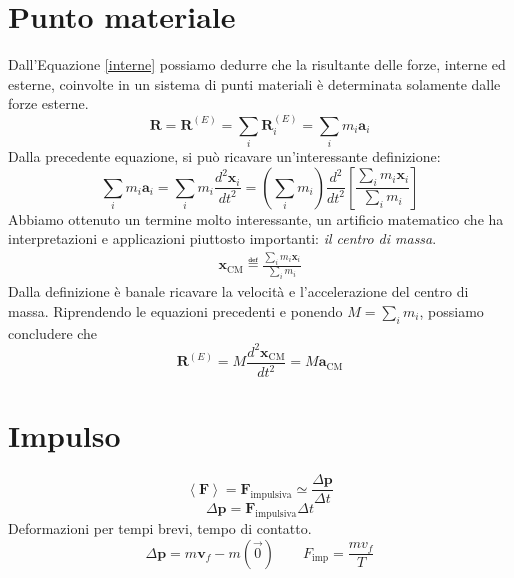 \section{Punto materiale}
Dall'Equazione \ref{interne} possiamo dedurre che la risultante delle
forze, interne ed esterne, coinvolte in un sistema di punti materiali
è determinata solamente dalle forze esterne.
\[ \mathbf{R} = \mathbf{R}^{(E)} = \sum_{i} \mathbf{R}^{(E)}_i = \sum_i m_i\mathbf{a}_i \]
Dalla precedente equazione, si può ricavare un'interessante definizione:
\[ \sum_i m_i\mathbf{a}_i = \sum_i m_i \frac{d^2\mathbf{x}_i}{dt^2} = \left(\sum_i m_i\right) \frac{d^2}{dt^2}\left[ \frac{\sum_i m_i\mathbf{x}_i}{\sum_i m_i} \right] \]
Abbiamo ottenuto un termine molto interessante, un artificio matematico
che ha interpretazioni e applicazioni piuttosto importanti: \textit{il
centro di massa}.
\begin{align}
    \mathbf{x}_\text{CM} \eqdef \frac{\sum_i m_i\mathbf{x}_i}{\sum_i m_i}
\end{align}
Dalla definizione è banale ricavare la velocità e l'accelerazione del
centro di massa. Riprendendo le equazioni precedenti e ponendo $M = \sum_i m_i$,
possiamo concludere che
\[ \mathbf{R}^{(E)} = M\frac{d^2\mathbf{x}_\text{CM}}{dt^2} = M\mathbf{a}_\text{CM} \]

\section{Impulso}
\[ \left\langle \mathbf{F} \right\rangle = \mathbf{F}_\text{impulsiva} \simeq \frac{\Delta\mathbf{p}}{\Delta t} \]
\[ \Delta\mathbf{p} = \mathbf{F}_\text{impulsiva}\Delta t \]
Deformazioni per tempi brevi, tempo di contatto.
\[ \Delta\mathbf{p} = m\mathbf{v}_f - m(\overrightarrow{0}) \qquad F_\text{imp} = \frac{mv_f}{T} \]
